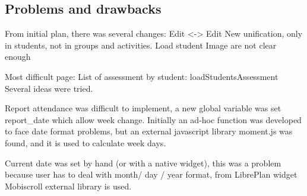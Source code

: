 \subsection{Problems and drawbacks}
 From initial plan, there was several changes:
  Edit <-> Edit New unification, only in students, not in groups and activities.
    Load student Image are not clear enough
    
  Most difficult page: List of assessment by student:
      loadStudentsAssessment
      Several ideas were tried.
    
    
  
  Report attendance was difficult to implement, a new global variable 
  was set report_date  which allow week change.
  Initially an ad-hoc function was developed to face date format problems,
  but an external javascript library moment.js was found, and it is 
  used to calculate week days.

 Current date was set by hand (or with a native widget), this was a problem
 because user has to deal with month/ day / year  format, from LibrePlan widget
  Mobiscroll external library is used.
  
      
      
      
      
  


		
